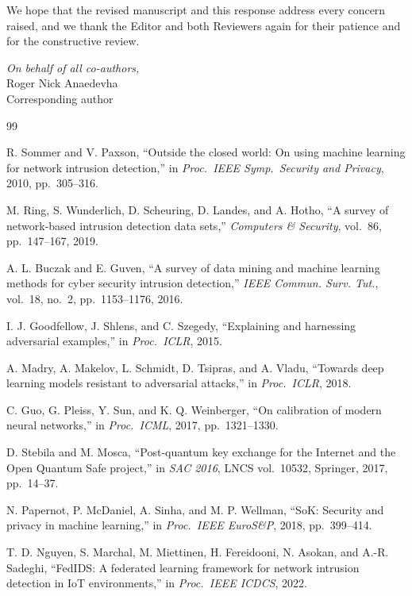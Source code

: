 \documentclass[11pt,a4paper]{article}
\begin{document}
\smallskip
We hope that the revised manuscript and this response address every
concern raised, and we thank the Editor and both Reviewers again for
their patience and for the constructive review.

\bigskip
\noindent\emph{On behalf of all co-authors,}\\
Roger Nick Anaedevha\\
Corresponding author

\begin{thebibliography}{99}

R. Sommer and V. Paxson, ``Outside the closed world: On using machine learning for network intrusion detection,'' in \emph{Proc.\ IEEE Symp.\ Security and Privacy}, 2010, pp.~305--316.

M. Ring, S. Wunderlich, D. Scheuring, D. Landes, and A. Hotho, ``A survey of network-based intrusion detection data sets,'' \emph{Computers \& Security}, vol.~86, pp.~147--167, 2019.

A. L. Buczak and E. Guven, ``A survey of data mining and machine learning methods for cyber security intrusion detection,'' \emph{IEEE Commun. Surv. Tut.}, vol.~18, no.~2, pp.~1153--1176, 2016.

I. J. Goodfellow, J. Shlens, and C. Szegedy, ``Explaining and harnessing adversarial examples,'' in \emph{Proc.\ ICLR}, 2015.

A. Madry, A. Makelov, L. Schmidt, D. Tsipras, and A. Vladu, ``Towards deep learning models resistant to adversarial attacks,'' in \emph{Proc.\ ICLR}, 2018.

C. Guo, G. Pleiss, Y. Sun, and K. Q. Weinberger, ``On calibration of modern neural networks,'' in \emph{Proc.\ ICML}, 2017, pp.~1321--1330.

D. Stebila and M. Mosca, ``Post-quantum key exchange for the Internet and the Open Quantum Safe project,'' in \emph{SAC 2016}, LNCS vol.~10532, Springer, 2017, pp.~14--37.

N. Papernot, P. McDaniel, A. Sinha, and M. P. Wellman, ``SoK: Security and privacy in machine learning,'' in \emph{Proc.\ IEEE EuroS\&P}, 2018, pp.~399--414.

T. D. Nguyen, S. Marchal, M. Miettinen, H. Fereidooni, N. Asokan, and A.-R. Sadeghi, ``FedIDS: A federated learning framework for network intrusion detection in IoT environments,'' in \emph{Proc.\ IEEE ICDCS}, 2022.


\end{thebibliography}
\end{document}
